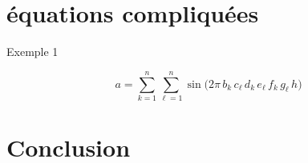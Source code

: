 \section{équations compliquées}

Exemple 1

\begin{equation}
a = \sum_{k=1}^n\sum_{\ell=1}^n
\sin \bigl(2\pi \, b_k \,
c_{\ell} \, d_k \, e_{\ell} \,
f_k \, g_{\ell} \, h \bigr)
\end{equation}


\vspace{1cm}









\section{Conclusion}